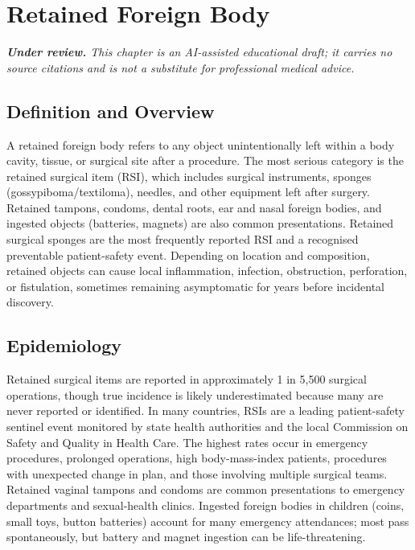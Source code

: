 \chapter{Retained Foreign Body}

\medskip
\noindent\textit{\textbf{Under review.} This chapter is an AI-assisted educational draft; it carries no source citations and is not a substitute for professional medical advice.}

\section*{Definition and Overview}
A retained foreign body refers to any object unintentionally left within a body cavity, tissue, or surgical site after a procedure. The most serious category is the retained surgical item (RSI), which includes surgical instruments, sponges (gossypiboma/textiloma), needles, and other equipment left after surgery. Retained tampons, condoms, dental roots, ear and nasal foreign bodies, and ingested objects (batteries, magnets) are also common presentations. Retained surgical sponges are the most frequently reported RSI and a recognised preventable patient-safety event. Depending on location and composition, retained objects can cause local inflammation, infection, obstruction, perforation, or fistulation, sometimes remaining asymptomatic for years before incidental discovery.

\section*{Epidemiology}
Retained surgical items are reported in approximately 1 in 5,500 surgical operations, though true incidence is likely underestimated because many are never reported or identified. In many countries, RSIs are a leading patient-safety sentinel event monitored by state health authorities and the local Commission on Safety and Quality in Health Care. The highest rates occur in emergency procedures, prolonged operations, high body-mass-index patients, procedures with unexpected change in plan, and those involving multiple surgical teams. Retained vaginal tampons and condoms are common presentations to emergency departments and sexual-health clinics. Ingested foreign bodies in children (coins, small toys, button batteries) account for many emergency attendances; most pass spontaneously, but battery and magnet ingestion can be life-threatening.

